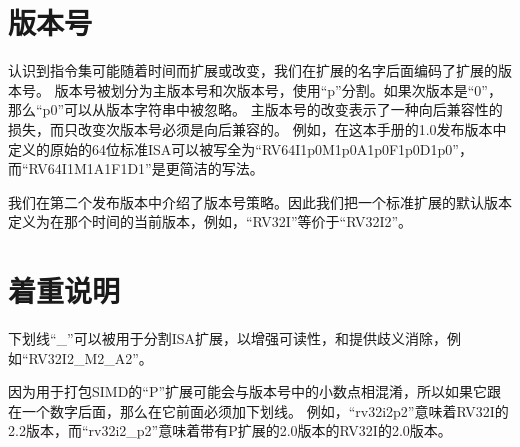 \section{版本号}
认识到指令集可能随着时间而扩展或改变，我们在扩展的名字后面编码了扩展的版本号。
版本号被划分为主版本号和次版本号，使用“p”分割。如果次版本是“0”，那么“p0”可以从版本字符串中被忽略。
主版本号的改变表示了一种向后兼容性的损失，而只改变次版本号必须是向后兼容的。
例如，在这本手册的1.0发布版本中定义的原始的64位标准ISA可以被写全为“RV64I1p0M1p0A1p0F1p0D1p0”，
而“RV64I1M1A1F1D1”是更简洁的写法。

我们在第二个发布版本中介绍了版本号策略。因此我们把一个标准扩展的默认版本定义为在那个时间的当前版本，例如，“RV32I”等价于“RV32I2”。

\section{着重说明}

下划线“\_”可以被用于分割ISA扩展，以增强可读性，和提供歧义消除，例如“RV32I2\_M2\_A2”。

因为用于打包SIMD的“P”扩展可能会与版本号中的小数点相混淆，所以如果它跟在一个数字后面，那么在它前面必须加下划线。
例如，“rv32i2p2”意味着RV32I的2.2版本，而“rv32i2\_p2”意味着带有P扩展的2.0版本的RV32I的2.0版本。

